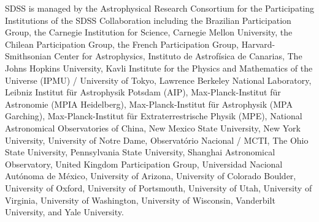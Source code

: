\documentclass[useAMS,usenatbib]{mn2e}
\begin{document}
SDSS is managed by the Astrophysical Research Consortium for the Participating 
Institutions of the SDSS Collaboration including the Brazilian Participation 
Group, the Carnegie Institution for Science, Carnegie Mellon University, the 
Chilean Participation Group, the French Participation Group, Harvard-Smithsonian 
Center for Astrophysics, Instituto de Astrof\'{i}sica de Canarias, The Johns 
Hopkins University, Kavli Institute for the Physics and Mathematics of the 
Universe (IPMU) / University of Tokyo, Lawrence Berkeley National Laboratory, 
Leibniz Institut f\"{u}r Astrophysik Potsdam (AIP), Max-Planck-Institut f\"{u}r 
Astronomie (MPIA Heidelberg), Max-Planck-Institut für Astrophysik (MPA 
Garching), Max-Planck-Institut für Extraterrestrische Physik (MPE), National 
Astronomical Observatories of China, New Mexico State University, New York 
University, University of Notre Dame, Observatório Nacional / MCTI, The Ohio 
State University, Pennsylvania State University, Shanghai Astronomical 
Observatory, United Kingdom Participation Group, Universidad Nacional 
Aut\'{o}noma de M\'{e}xico, University of Arizona, University of Colorado 
Boulder, University of Oxford, University of Portsmouth, University of Utah, 
University of Virginia, University of Washington, University of Wisconsin, 
Vanderbilt University, and Yale University.
\newpage


\end{document}
